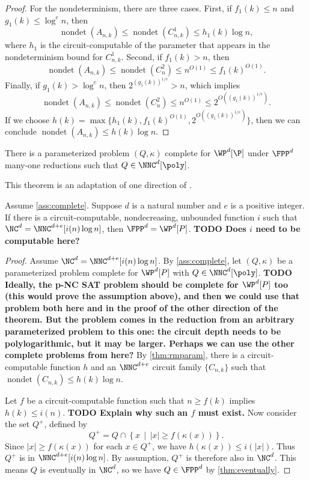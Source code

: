 \documentclass{article}
\newcommand{\todo}[1]{\textbf{TODO #1}}
\DeclareMathOperator{\nondet}{nondet}
\begin{document}
\begin{proof}
  For the nondeterminism, there are three cases.
  First, if $f_1(k) \leq n$ and $g_1(k) \leq \log^e n$, then
  \[
  \nondet(A_{n, k}) \leq \nondet(C^1_{n, k}) \leq h_1(k) \log n,
  \]
  where $h_1$ is the circuit-computable of the parameter that appears in the nondeterminism bound for $C^1_{n, k}$.
  Second, if $f_1(k) > n$, then
  \[
  \nondet(A_{n, k}) \leq \nondet(C^2_n) \leq n^{O(1)} \leq f_1(k)^{O(1)}.
  \]
  Finally, if $g_1(k) > \log^e n$, then $2^{(g_1(k))^{1 / e}} > n$, which implies
  \[
  \nondet(A_{n, k}) \leq \nondet(C^2_n) \leq n^{O(1)} \leq 2^{O((g_1(k))^{1 / e})}.
  \]
  If we choose $h(k) = \max\{ h_1(k), f_1(k)^{O(1)}, 2^{O((g_1(k))^{1 / e})} \}$, then we can conclude $\nondet(A_{n, k}) \leq h(k) \log n$.
\end{proof}

\begin{assumption}\label{ass:complete}
  There is a parameterized problem $(Q, \kappa)$ complete for $\WP^d[\P]$ under $\FPP^d$ many-one reductions such that $Q \in \NNC^d[\poly]$.
\end{assumption}

This theorem is an adaptation of one direction of \autocite[Theorem~3.29]{fg06}.

\begin{theorem}\label{thm:wppparti}
  Assume \autoref{ass:complete}.
  Suppose $d$ is a natural number and $e$ is a positive integer.
  If there is a circuit-computable, nondecreasing, unbounded function $i$ such that $\NC^d = \NNC^{d + e}[i(n) \log n]$, then $\FPP^d = \WP^d[P]$.
  \todo{Does $i$ need to be computable here?}
\end{theorem}
\begin{proof}
  Assume $\NC^d = \NNC^{d + e}[i(n) \log n]$.
  By \autoref{ass:complete}, let $(Q, \kappa)$ be a parameterized problem complete for $\WP^d[P]$ with $Q \in \NNC^d[\poly]$.
  \todo{
    Ideally, the p-NC SAT problem should be complete for $\WP^d[P]$ too (this would prove the assumption above), and then we could use that problem both here and in the proof of the other direction of the theorem.
    But the problem comes in the reduction from an arbitrary parameterized problem to this one: the circuit depth needs to be polylogarithmic, but it may be larger.
    Perhaps we can use the other complete problems from \autocite{cc97lim} here?
  }
  By \autoref{thm:rmparam}, there is a circuit-computable function $h$ and an $\NNC^{d + e}$ circuit family $\{C_{n, k}\}$ such that $\nondet(C_{n, k}) \leq h(k) \log n$.

  Let $f$ be a circuit-computable function such that $n \geq f(k)$ implies $h(k) \leq i(n)$.
  \todo{Explain why such an $f$ must exist.}
  Now consider the set $Q^+$, defined by
  \[
  Q^+ = Q \cap \left\{ x \, \middle| \, |x| \geq f(\kappa(x)) \right\}.
  \]
  Since $|x| \geq f(\kappa(x))$ for each $x \in Q^+$, we have $h(\kappa(x)) \leq i(|x|)$.
  Thus $Q^+$ is in $\NNC^{d + e}[i(n) \log n]$.
  By assumption, $Q^+$ is therefore also in $\NC^d$.
  This means $Q$ is eventually in $\NC^d$, so we have $Q \in \FPP^d$ by \autoref{thm:eventually}.
\end{proof}
\end{document}
